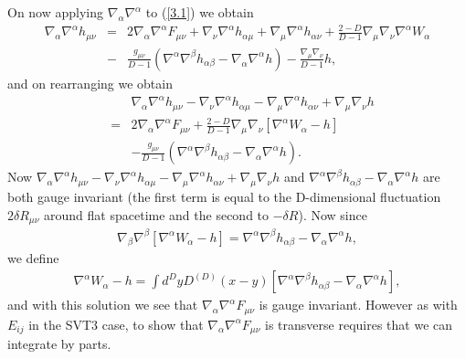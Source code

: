 On now applying $\nabla_{\alpha}\nabla^{\alpha}$ to (\ref{3.1}) we obtain
%
\begin{eqnarray}
\nabla_{\alpha}\nabla^{\alpha}h_{\mu\nu}&=&2\nabla_{\alpha}\nabla^{\alpha}F_{\mu\nu}+\nabla_{\nu}\nabla^{\alpha}h_{\alpha\mu}+\nabla_{\mu}\nabla^{\alpha}h_{\alpha\nu}+\frac{2-D}{D-1}\nabla_{\mu}\nabla_{\nu}\nabla^{\alpha}W_{\alpha}
\nonumber\\
&-&\frac{g_{\mu\nu}}{D-1}(\nabla^{\alpha}\nabla^{\beta}h_{\alpha\beta}-\nabla_{\alpha}\nabla^{\alpha}h)-\frac{\nabla_{\mu}\nabla_{\nu}}{D-1}h,
\label{3.4}
\end{eqnarray}
%
and on rearranging we obtain
%
\begin{eqnarray}
&&\nabla_{\alpha}\nabla^{\alpha}h_{\mu\nu}-\nabla_{\nu}\nabla^{\alpha}h_{\alpha\mu}-\nabla_{\mu}\nabla^{\alpha}h_{\alpha\nu}+\nabla_{\mu}\nabla_{\nu}h
\nonumber\\
&=&2\nabla_{\alpha}\nabla^{\alpha}F_{\mu\nu}+\frac{2-D}{D-1}\nabla_{\mu}\nabla_{\nu}[\nabla^{\alpha}W_{\alpha}-h]
\nonumber\\
&&-\frac{g_{\mu\nu}}{D-1}(\nabla^{\alpha}\nabla^{\beta}h_{\alpha\beta}-\nabla_{\alpha}\nabla^{\alpha}h).
\label{3.5}
\end{eqnarray}
%
Now $\nabla_{\alpha}\nabla^{\alpha}h_{\mu\nu}-\nabla_{\nu}\nabla^{\alpha}h_{\alpha\mu}-\nabla_{\mu}\nabla^{\alpha}h_{\alpha\nu}+\nabla_{\mu}\nabla_{\nu}h$ and $\nabla^{\alpha}\nabla^{\beta}h_{\alpha\beta}-\nabla_{\alpha}\nabla^{\alpha}h$ are both gauge invariant (the first term is equal to the D-dimensional fluctuation $2\delta R_{\mu\nu}$ around flat spacetime and the second to $-\delta R$). Now since
%
\begin{eqnarray}
\nabla_{\beta}\nabla^{\beta}[\nabla^{\alpha}W_{\alpha}-h]=\nabla^{\alpha}\nabla^{\beta}h_{\alpha\beta}-\nabla_{\alpha}\nabla^{\alpha}h,
\label{3.6}
\end{eqnarray}
%
we define
%
\begin{eqnarray}
\nabla^{\alpha}W_{\alpha}-h=\int d^DyD^{(D)}(x-y)[\nabla^{\alpha}\nabla^{\beta}h_{\alpha\beta}-\nabla_{\alpha}\nabla^{\alpha}h],
\label{3.7}
\end{eqnarray}
%
and with this solution we see that  $\nabla_{\alpha}\nabla^{\alpha}F_{\mu\nu}$ is gauge invariant. However as with $E_{ij}$ in the SVT3 case, to show that $\nabla_{\alpha}\nabla^{\alpha}F_{\mu\nu}$ is transverse requires that we can integrate by parts.

